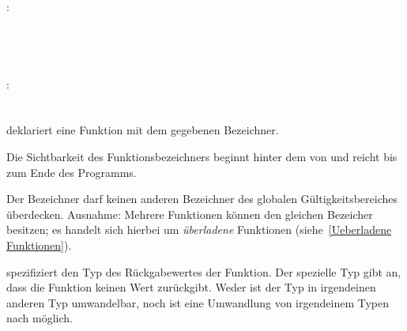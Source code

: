 \hspace*{1cm}\glq{}\grq \glq{}\grq  {}   \glq\Gt{=}\grq  {} \glq\Gt{,}\grq  {} \\
:\label{funktion_aufruf}\\
\hspace*{1cm}  \glq\Gt{(}\grq  \glq\Gt{)}\grq \\
\hspace*{1cm}  \glq\Gt{(}\grq {}  \glq\Gt{)}\grq \\
\hspace*{1cm}  \glq\Gt{(}\grq  \glq\Gt{)}\grq \\
\hspace*{1cm}  \glq\Gt{(}\grq {}  \glq\Gt{)}\grq \\
:\label{funktion_param_tatsaechl}\\
\hspace*{1cm} \\
\hspace*{1cm} \glq\Gt{,}\grq  {} \\


 deklariert eine Funktion mit dem gegebenen Bezeichner.

Die Sichtbarkeit des Funktionsbezeichners beginnt hinter dem \kw{)} von 
und reicht bis zum Ende des Programms.

Der Bezeichner darf keinen anderen Bezeichner des globalen Gültigkeitsbereiches überdecken.
Ausnahme: Mehrere Funktionen können den gleichen Bezeicher besitzen; es handelt sich hierbei
um \emph{überladene} Funktionen (siehe~\ref{Ueberladene Funktionen}).

 spezifiziert den Typ des Rückgabewertes der Funktion. Der spezielle Typ 
gibt an, dass die Funktion keinen Wert zurückgibt.
Weder ist der Typ  in irgendeinen anderen Typ umwandelbar, noch ist eine Umwandlung
von irgendeinem Typen nach  möglich.

